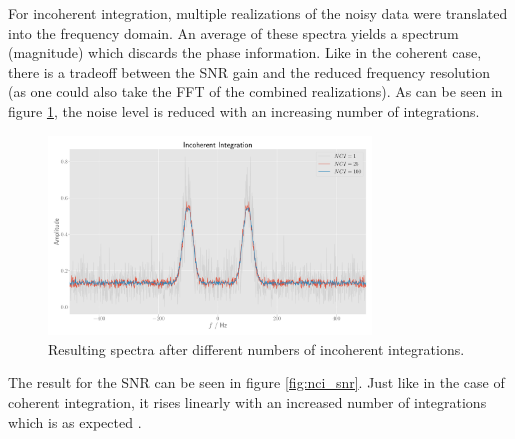 
For incoherent integration, multiple realizations of the noisy data were translated into the frequency domain. An average of these spectra yields a spectrum (magnitude) which discards the phase information. Like in the coherent case, there is a tradeoff between the SNR gain and the reduced frequency resolution (as one could also take the FFT of the combined realizations). As can be seen in figure \ref{fig:nci_reali}, the noise level is reduced with an increasing number of integrations.\\

\begin{figure}[h]
  \centering
  \includegraphics[width=0.763\textwidth]{graphics/rfig.pdf}
  \caption{Resulting spectra after different numbers of incoherent integrations.}\label{fig:nci_reali}
\end{figure}

The result for the SNR can be seen in figure \ref{fig:nci_snr}. Just like in the case of coherent integration, it rises linearly with an increased number of integrations which is as expected \cite{yt_tut}.


